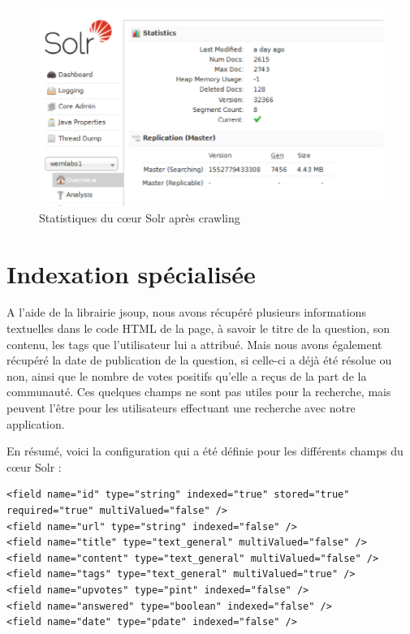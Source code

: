\documentclass[a4paper]{article}
\begin{document}
	\begin{figure}[H]
		\centering
		\includegraphics[width=\columnwidth]{images/01-solr-stats.png}
		\caption{Statistiques du cœur Solr après crawling}
	\end{figure}

	\section{Indexation spécialisée}
	A l'aide de la librairie jsoup, nous avons récupéré plusieurs informations textuelles dans le code HTML de la page,
	à savoir le titre de la question, son contenu, les tags que l'utilisateur lui a attribué.
	Mais nous avons également récupéré la date de publication de la question, si celle-ci a déjà été résolue ou non,
	ainsi que le nombre de votes positifs qu'elle a reçus de la part de la communauté. Ces quelques champs ne sont pas utiles pour la recherche,
	mais peuvent l'être pour les utilisateurs effectuant une recherche avec notre application.
	
	En résumé, voici la configuration qui a été définie pour les différents champs du cœur Solr :

	\lstset{language=XML}
	\begin{lstlisting}
<field name="id" type="string" indexed="true" stored="true" required="true" multiValued="false" />
<field name="url" type="string" indexed="false" />
<field name="title" type="text_general" multiValued="false" />
<field name="content" type="text_general" multiValued="false" />
<field name="tags" type="text_general" multiValued="true" />
<field name="upvotes" type="pint" indexed="false" />
<field name="answered" type="boolean" indexed="false" />
<field name="date" type="pdate" indexed="false" />
	\end{lstlisting}
\end{document}
